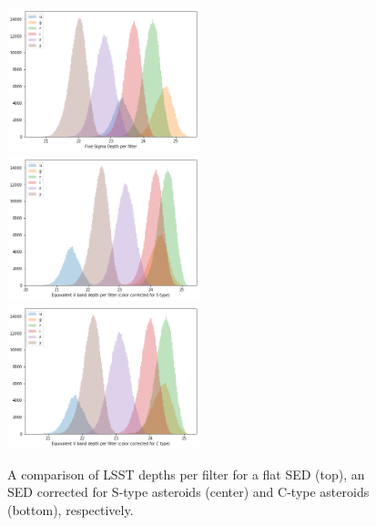 \begin{figure}[tb!]
\begin{center}
\includegraphics[width=0.5\textwidth]{figs/5sig_filter.png}\\
\includegraphics[width=0.5\textwidth]{figs/5sig_filter_S.png}\\
\includegraphics[width=0.5\textwidth]{figs/5sig_filter_C.png}
\end{center}
\caption{A comparison of \gls{LSST} depths per filter for a flat \gls{SED} (top), an \gls{SED} corrected for S-type asteroids (center) and C-type asteroids (bottom), respectively.}
\label{fig:sed}       %
\end{figure}
%
% 
\clearpage
